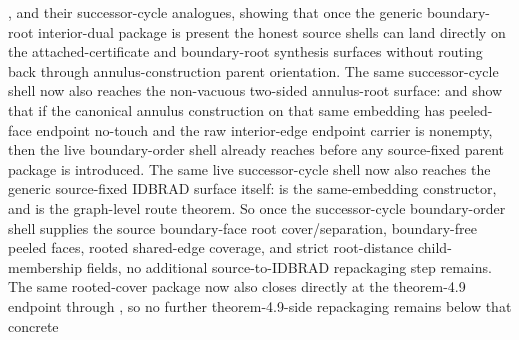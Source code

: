 \documentclass[11pt]{article}
\begin{document}
,
and their successor-cycle analogues, showing that once the generic
boundary-root interior-dual package is present the honest source shells can
land directly on the attached-certificate and boundary-root synthesis surfaces
without routing back through annulus-construction parent orientation.  The same
successor-cycle shell now also reaches the non-vacuous two-sided annulus-root
surface:
and
show that if the canonical annulus construction on that same embedding has
peeled-face endpoint no-touch and the raw interior-edge endpoint carrier is
nonempty, then the live boundary-order shell already reaches
 before any source-fixed parent
package is introduced.
The same live successor-cycle shell now also reaches the generic source-fixed
IDBRAD surface itself:
is the same-embedding constructor, and
is the graph-level route theorem.  So once the successor-cycle boundary-order
shell supplies the source boundary-face root cover/separation, boundary-free
peeled faces, rooted shared-edge coverage, and strict root-distance
child-membership fields, no additional source-to-IDBRAD repackaging step
remains.  The same rooted-cover package now also closes directly at the
theorem-4.9 endpoint through
,
so no further theorem-4.9-side repackaging remains below that concrete
\end{document}
